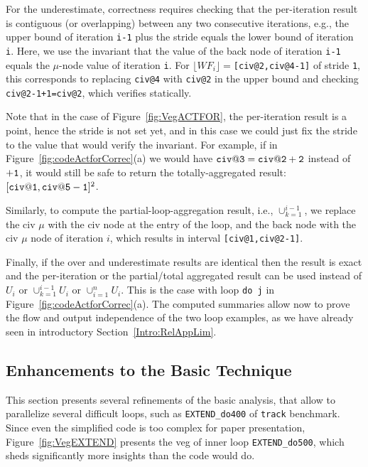 \documentclass{sig-alternate}
\begin{document}
For the underestimate, correctness requires checking that the
per-iteration result is contiguous (or overlapping) 
between any two consecutive iterations, 
e.g., the upper bound of iteration {\tt i-1} plus the stride 
equals the lower bound of iteration {\tt i}.
%
Here, we use the invariant that the value of the back 
node of iteration {\tt{}i-1} equals the $\mu$-node value of iteration {\tt i}.
%
For $\lfloor WF_i \rfloor=${\tt [{\tt civ@2},{\tt civ@4}-1]} of stride {\tt 1},
this corresponds to replacing {\tt civ@4} with {\tt civ@2} in the upper bound and
checking {\tt civ@2-1+1=civ@2},
which verifies statically. 

Note that in the case of Figure~\ref{fig:VegACTFOR},
the per-iteration result is a point, hence the stride is not set yet, and in
this case we could just fix the stride to the value that would verify the
invariant. For example, if in Figure~\ref{fig:codeActforCorrec}(a) we would have 
${\tt civ@3 = civ@2+2}$ instead of $+{\tt 1}$, it would still
be safe to return the totally-aggregated result: $[{\tt civ@1},{\tt civ@5-1}]^2$.

Similarly, to compute the partial-loop-aggregation result, i.e., $\cup_{k=1}^{i-1}$,
we replace the {\sc civ} $\mu$ with the {\sc civ} node at the entry of the loop,
and the back node with the {\sc civ} $\mu$ node of iteration $i$, 
which results in interval {\tt[civ@1,civ@2-1]}.

Finally, if the over and underestimate results are identical then the result is
exact and the per-iteration or the partial/total aggregated result can be used
instead of $U_i$ or $\cup_{k=1}^{i-1} U_i$ or $\cup_{i=1}^n U_i$.  This is the
case with loop {\tt do j} in Figure~\ref{fig:codeActforCorrec}(a).  
%
The computed summaries allow now to prove the flow and output independence of the 
two loop examples, as we have already seen in introductory Section~\ref{Intro:RelAppLim}.


\subsection{Enhancements to the Basic Technique}
\label{subsec:Track}


This section presents several refinements of the basic analysis,
that allow to parallelize several difficult loops, such as {\tt EXTEND\_do400} 
of {\tt track} benchmark. Since even the simplified code
is too complex for paper presentation, Figure~\ref{fig:VegEXTEND} presents the 
{\sc veg} of inner loop {\tt EXTEND\_do500}, which sheds significantly more 
insights than the code would do.
\end{document}

